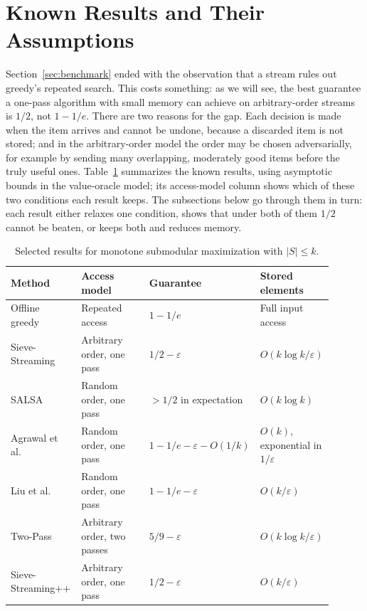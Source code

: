 \documentclass[10pt]{article}
\begin{document}
\section{Known Results and Their Assumptions}
\label{sec:results}
Section~\ref{sec:benchmark} ended with the observation that a stream rules out greedy's repeated search. This costs something: as we will see, the best guarantee a one-pass algorithm with small memory can achieve on arbitrary-order streams is $1/2$, not $1-1/e$. There are two reasons for the gap. Each decision is made when the item arrives and cannot be undone, because a discarded item is not stored; and in the arbitrary-order model the order may be chosen adversarially, for example by sending many overlapping, moderately good items before the truly useful ones. Table~\ref{tab:results} summarizes the known results, using asymptotic bounds in the value-oracle model; its access-model column shows which of these two conditions each result keeps. The subsections below go through them in turn: each result either relaxes one condition, shows that under both of them $1/2$ cannot be beaten, or keeps both and reduces memory.

\begin{table}[ht]
\centering
\caption{Selected results for monotone submodular maximization with $|S|\leq k$.}
\label{tab:results}
\begin{tabular}{@{}p{0.22\linewidth}p{0.24\linewidth}p{0.24\linewidth}p{0.20\linewidth}@{}}
\toprule
Method & Access model & Guarantee & Stored elements \\
\midrule
Offline greedy \cite{nemhauser1978analysis} & Repeated access & $1-1/e$ & Full input access \\
Sieve-Streaming \cite{badanidiyuru2014streaming} & Arbitrary order, one pass & $1/2-\varepsilon$ & $O(k\log k/\varepsilon)$ \\
SALSA \cite{norouzifard2018beyond} & Random order, one pass & $>1/2$ in expectation & $O(k\log k)$ \\
Agrawal et al.\ \cite{agrawal2019shortlists} & Random order, one pass & $1-1/e-\varepsilon-O(1/k)$ & $O(k)$, exponential in $1/\varepsilon$ \\
Liu et al.\ \cite{liu2021random} & Random order, one pass & $1-1/e-\varepsilon$ & $O(k/\varepsilon)$ \\
Two-Pass \cite{norouzifard2018beyond} & Arbitrary order, two passes & $5/9-\varepsilon$ & $O(k\log k/\varepsilon)$ \\
Sieve-Streaming++ \cite{kazemi2019glory} & Arbitrary order, one pass & $1/2-\varepsilon$ & $O(k/\varepsilon)$ \\
\bottomrule
\end{tabular}
\end{table}
\end{document}
